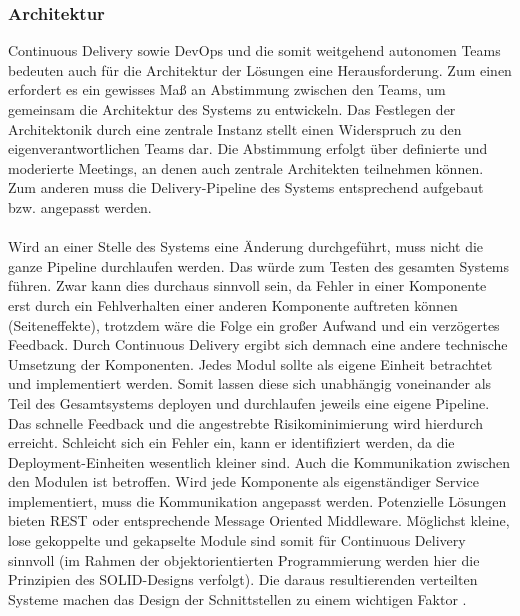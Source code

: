 \subsubsection{Architektur}
Continuous Delivery sowie DevOps und die somit weitgehend autonomen Teams bedeuten auch für die Architektur der Lösungen eine Herausforderung. Zum einen erfordert es ein gewisses Maß an Abstimmung zwischen den Teams, um gemeinsam die Architektur des Systems zu entwickeln. Das Festlegen der Architektonik durch eine zentrale Instanz stellt einen Widerspruch zu den eigenverantwortlichen Teams dar. Die Abstimmung erfolgt über definierte und moderierte Meetings, an denen auch zentrale Architekten teilnehmen können. Zum anderen muss die Delivery-Pipeline des Systems entsprechend aufgebaut bzw. angepasst werden.\\ \\ Wird an einer Stelle des Systems eine Änderung durchgeführt, muss nicht die ganze Pipeline durchlaufen werden. Das würde zum Testen des gesamten Systems führen. Zwar kann dies durchaus sinnvoll sein, da Fehler in einer Komponente erst durch ein Fehlverhalten einer anderen Komponente auftreten können (Seiteneffekte), trotzdem wäre die Folge ein großer Aufwand und ein verzögertes Feedback. Durch Continuous Delivery ergibt sich demnach eine andere technische Umsetzung der Komponenten. Jedes Modul sollte als eigene Einheit betrachtet und implementiert werden. Somit lassen diese sich unabhängig voneinander als Teil des Gesamtsystems deployen und durchlaufen jeweils eine eigene Pipeline. Das schnelle Feedback und die angestrebte Risikominimierung wird hierdurch erreicht. Schleicht sich ein Fehler ein, kann er identifiziert werden, da die Deployment-Einheiten wesentlich kleiner sind. Auch die Kommunikation zwischen den Modulen ist betroffen. Wird jede Komponente als eigenständiger Service implementiert, muss die Kommunikation angepasst werden. Potenzielle Lösungen bieten REST oder entsprechende Message Oriented Middleware. Möglichst kleine, lose gekoppelte und gekapselte Module sind somit für Continuous Delivery sinnvoll (im Rahmen der objektorientierten Programmierung werden hier die Prinzipien des SOLID-Designs verfolgt). Die daraus resultierenden verteilten Systeme machen das Design der Schnittstellen zu einem wichtigen Faktor \cite{Wolff.2016}. \\ \\
